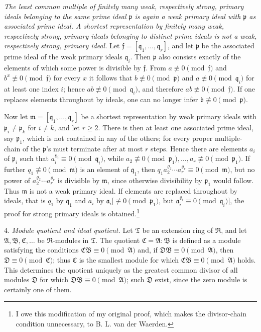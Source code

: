 \documentclass[11pt]{article}
\providecommand{\mR}{\mathfrak{R}}
\providecommand{\mT}{\mathfrak{T}}
\providecommand{\mA}{\mathfrak{A}}
\providecommand{\mB}{\mathfrak{B}}
\providecommand{\mC}{\mathfrak{C}}
\providecommand{\mD}{\mathfrak{D}}
\providecommand{\ma}{\mathfrak{a}}
\providecommand{\mb}{\mathfrak{b}}
\providecommand{\mf}{\mathfrak{f}}
\providecommand{\mm}{\mathfrak{m}}
\providecommand{\mpideal}{\mathfrak{p}}
\providecommand{\mq}{\mathfrak{q}}
\begin{document}
\emph{The least common multiple of finitely many weak, respectively strong, primary ideals belonging to the same prime ideal $\mpideal$ is again a weak primary ideal with $\mpideal$ as associated prime ideal. A shortest representation by finitely many weak, respectively strong, primary ideals belonging to distinct prime ideals is not a weak, respectively strong, primary ideal.} Let $\mf=[\mq_1,
\ldots,\mq_r]$, and let $\mpideal$ be the associated prime ideal of the weak primary ideals $\mq_i$. Then $\mpideal$ also consists exactly of the elements of which some power is divisible by $\mf$. From $a\not\equiv0\pmod{\mf}$ and $b^x\not\equiv0\pmod{\mf}$ for every $x$ it follows that $b\not\equiv0\pmod{\mpideal}$ and $a\not\equiv0\pmod{\mq_i}$ for at least one index $i$; hence $ab\not\equiv0\pmod{\mq_i}$, and therefore $ab\not\equiv0\pmod{\mf}$. If one replaces elements throughout by ideals, one can no longer infer $\mb\not\equiv0\pmod{\mpideal}$.

Now let $\mm=[\mq_1,
\ldots,\mq_r]$ be a shortest representation by weak primary ideals with $\mpideal_i\ne\mpideal_k$ for $i\ne k$, and let $r\ge2$. There is then at least one associated prime ideal, say $\mpideal_1$, which is not contained in any of the others; for every proper multiple-chain of the $\mpideal$'s must terminate after at most $r$ steps. Hence there are elements $a_i$ of $\mpideal_i$ such that $a_i^{\varrho_i}\equiv0\pmod{\mq_i}$, while $a_2\not\equiv0\pmod{\mpideal_1},
\ldots,a_r\not\equiv0\pmod{\mpideal_1}$. If further $q_1\not\equiv0\pmod{\mm}$ is an element of $\mq_1$, then $q_1a_2^{\varrho_2}\cdots a_r^{\varrho_r}\equiv0\pmod{\mm}$, but no power of $a_2^{\varrho_2}\cdots a_r^{\varrho_r}$ is divisible by $\mm$, since otherwise divisibility by $\mpideal_1$ would follow. Thus $\mm$ is not a weak primary ideal. If elements are replaced throughout by ideals, that is $q_1$ by $\mq_1$ and $a_i$ by $\ma_i[\not\equiv0\pmod{\mpideal_1}$, but $\ma_i^{\varrho_i}\equiv0\pmod{\mq_i}]$, the proof for strong primary ideals is obtained.\footnote{I owe this modification of my original proof, which makes the divisor-chain condition unnecessary, to B. L. van der Waerden.}

4. \emph{Module quotient and ideal quotient.} Let $\mT$ be an extension ring of $\mR$, and let $\mA,\mB,\mC,
\ldots$ be $\mR$-modules in $\mT$. The quotient $\mC=\mA:\mB$ is defined as a module satisfying the conditions $\mC\mB\equiv0\pmod{\mA}$ and, if $\mD\mB\equiv0\pmod{\mA}$, then $\mD\equiv0\pmod{\mC}$; thus $\mC$ is the smallest module for which $\mC\mB\equiv0\pmod{\mA}$ holds. This determines the quotient uniquely as the greatest common divisor of all modules $\mD$ for which $\mD\mB\equiv0\pmod{\mA}$; such $\mD$ exist, since the zero module is certainly one of them.
\end{document}
